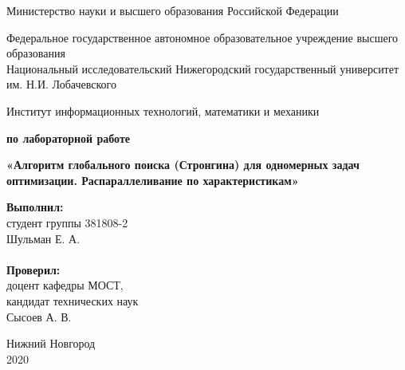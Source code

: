 \documentclass{report}
\begin{document}
\begin{titlepage}

\begin{center}
Министерство науки и высшего образования Российской Федерации
\end{center}

\begin{center}
Федеральное государственное автономное образовательное учреждение высшего образования \\
Национальный исследовательский Нижегородский государственный университет им. Н.И. Лобачевского
\end{center}

\begin{center}
Институт информационных технологий, математики и механики
\end{center}

\vspace{4em}

\begin{center}
\textbf{ по лабораторной работе} \\
\end{center}
\begin{center}
\textbf{\Large«Алгоритм глобального поиска (Стронгина) для одномерных задач оптимизации.
Распараллеливание по характеристикам»} \\
\end{center}

\vspace{4em}

\newbox{\lbox}
\newlength{\maxl}
\setlength{\maxl}{\wd\lbox}
\hfill\parbox{7cm}{
\hspace*{5cm}\hspace*{-5cm}\textbf{Выполнил:} \\ студент группы 381808-2 \\ Шульман Е. А.\\
\\
\hspace*{5cm}\hspace*{-5cm}\textbf{Проверил:}\\ доцент кафедры МОСТ, \\ кандидат технических наук \\ Сысоев А. В. \\
}
\vspace{\fill}

\begin{center} Нижний Новгород \\ 2020 \end{center}

\end{titlepage}
\end{document}
